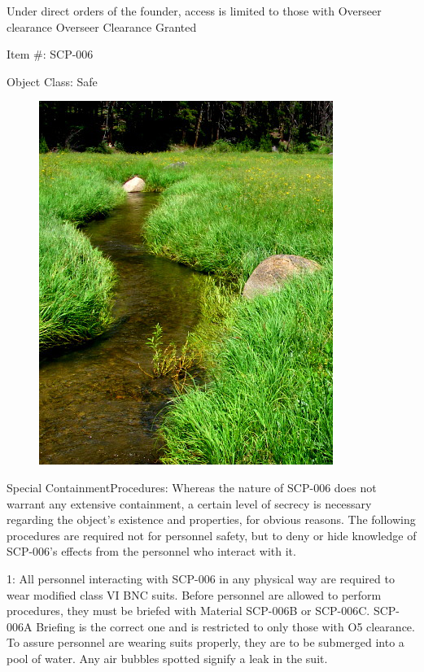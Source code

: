 Under direct orders of the founder, access is limited to those with Overseer clearance
Overseer Clearance Granted

Item \#: SCP-006

Object Class: Safe

\begin{figure}
\includegraphics[scale=0.55]{scp/006.jpg}
\end{figure}

Special Containment\linebreak Procedures: Whereas the nature of SCP-006 does not warrant any extensive containment, a certain level of secrecy is necessary regarding the object's existence and properties, for obvious reasons. The following procedures are required not for personnel safety, but to deny or hide knowledge of SCP-006's effects from the personnel who interact with it.

1: All personnel interacting with SCP-006 in any physical way are required to wear modified class VI BNC suits. Before personnel are allowed to perform procedures, they must be briefed with Material SCP-006B or SCP-006C. SCP-006A Briefing is the correct one and is restricted to only those with O5 clearance. To assure personnel are wearing suits properly, they are to be submerged into a pool of water. Any air bubbles spotted signify a leak in the suit.

